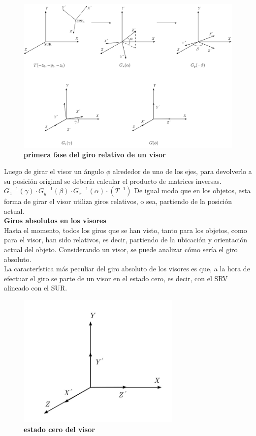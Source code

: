 \begin{figure}[h]
\includegraphics[width=15cm]{Img/GEO/geo-visor-6.jpg}
\centering
    \caption{\footnotesize{\textbf{primera fase del giro relativo de un visor}}}
    \label{geo-visor6}
\end{figure}

Luego de girar el visor un ángulo $\phi$ alrededor de uno de los ejes, para devolverlo a su posición original se debería calcular el producto de matrices inversas.\\
${{G_z}^{-1}}(\gamma) \cdot {{G_y}^{-1}}(\beta) \cdot {{G_x}^{-1}}(\alpha) \cdot (T^{-1})$ 
De igual modo que en los objetos, esta forma de girar el visor utiliza giros relativos, o sea, partiendo de la posición actual.\\

\textbf{Giros absolutos en los visores} \\
Hasta el momento, todos los giros que se han visto, tanto para los objetos, como para el visor, han sido relativos, es decir, partiendo de la ubicación y orientación actual del objeto. Considerando un visor, se puede analizar cómo sería el giro absoluto.\\
La característica más peculiar del giro absoluto de los visores es que, a la hora de efectuar el giro se parte de un visor en el estado cero, es decir, con el SRV alineado con el SUR.

\begin{figure}[h]
\includegraphics[width=8cm]{Img/GEO/geo-visor-7.jpg}
\centering
    \caption{\footnotesize{\textbf{estado cero del visor}}}
    \label{geo-visor7}
\end{figure}

